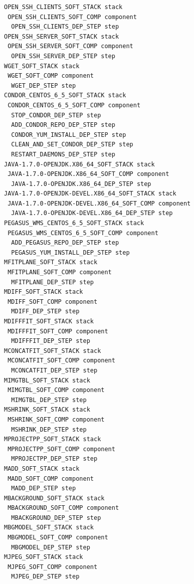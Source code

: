 
\begin{lstlisting}[caption={Abstract deployment plan of the Montage WF},label={lst:plan-montge}]
OPEN_SSH_CLIENTS_SOFT_STACK stack
 OPEN_SSH_CLIENTS_SOFT_COMP component
  OPEN_SSH_CLIENTS_DEP_STEP step
OPEN_SSH_SERVER_SOFT_STACK stack
 OPEN_SSH_SERVER_SOFT_COMP component
  OPEN_SSH_SERVER_DEP_STEP step
WGET_SOFT_STACK stack
 WGET_SOFT_COMP component
  WGET_DEP_STEP step
CONDOR_CENTOS_6_5_SOFT_STACK stack
 CONDOR_CENTOS_6_5_SOFT_COMP component
  STOP_CONDOR_DEP_STEP step
  ADD_CONDOR_REPO_DEP_STEP step
  CONDOR_YUM_INSTALL_DEP_STEP step
  CLEAN_AND_SET_CONDOR_DEP_STEP step
  RESTART_DAEMONS_DEP_STEP step
JAVA-1.7.0-OPENJDK.X86_64_SOFT_STACK stack
 JAVA-1.7.0-OPENJDK.X86_64_SOFT_COMP component
  JAVA-1.7.0-OPENJDK.X86_64_DEP_STEP step
JAVA-1.7.0-OPENJDK-DEVEL.X86_64_SOFT_STACK stack
 JAVA-1.7.0-OPENJDK-DEVEL.X86_64_SOFT_COMP component
  JAVA-1.7.0-OPENJDK-DEVEL.X86_64_DEP_STEP step
PEGASUS_WMS_CENTOS_6_5_SOFT_STACK stack
 PEGASUS_WMS_CENTOS_6_5_SOFT_COMP component
  ADD_PEGASUS_REPO_DEP_STEP step
  PEGASUS_YUM_INSTALL_DEP_STEP step
MFITPLANE_SOFT_STACK stack
 MFITPLANE_SOFT_COMP component
  MFITPLANE_DEP_STEP step
MDIFF_SOFT_STACK stack
 MDIFF_SOFT_COMP component
  MDIFF_DEP_STEP step
MDIFFFIT_SOFT_STACK stack
 MDIFFFIT_SOFT_COMP component
  MDIFFFIT_DEP_STEP step
MCONCATFIT_SOFT_STACK stack
 MCONCATFIT_SOFT_COMP component
  MCONCATFIT_DEP_STEP step
MIMGTBL_SOFT_STACK stack
 MIMGTBL_SOFT_COMP component
  MIMGTBL_DEP_STEP step
MSHRINK_SOFT_STACK stack
 MSHRINK_SOFT_COMP component
  MSHRINK_DEP_STEP step
MPROJECTPP_SOFT_STACK stack
 MPROJECTPP_SOFT_COMP component
  MPROJECTPP_DEP_STEP step
MADD_SOFT_STACK stack
 MADD_SOFT_COMP component
  MADD_DEP_STEP step
MBACKGROUND_SOFT_STACK stack
 MBACKGROUND_SOFT_COMP component
  MBACKGROUND_DEP_STEP step
MBGMODEL_SOFT_STACK stack
 MBGMODEL_SOFT_COMP component
  MBGMODEL_DEP_STEP step
MJPEG_SOFT_STACK stack
 MJPEG_SOFT_COMP component
  MJPEG_DEP_STEP step
\end{lstlisting}


